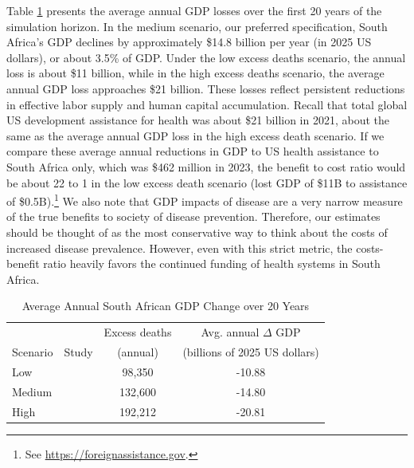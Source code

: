 \documentclass[letterpaper,12pt]{article}
\theoremstyle{definition}
\begin{document}
\begin{spacing}{1.5}
Table \ref{tab:avgGDPChange} presents the average annual GDP losses over the first 20 years of the simulation horizon. In the medium scenario, our preferred specification, South Africa's GDP declines by approximately \$14.8 billion per year (in 2025 US dollars), or about 3.5\% of GDP. Under the low excess deaths scenario, the annual loss is about \$11 billion, while in the high excess deaths scenario, the average annual GDP loss approaches \$21 billion. These losses reflect persistent reductions in effective labor supply and human capital accumulation. Recall that total global US development assistance for health was about \$21 billion in 2021, about the same as the average annual GDP loss in the high excess death scenario. If we compare these average annual reductions in GDP to US health assistance to South Africa only, which was \$462 million in 2023, the benefit to cost ratio would be about 22 to 1 in the low excess death scenario (lost GDP of \$11B to assistance of \$0.5B).\footnote{See \href{https://foreignassistance.gov}{https://foreignassistance.gov}.} We also note that GDP impacts of disease are a very narrow measure of the true benefits to society of disease prevention.  Therefore, our estimates should be thought of as the most conservative way to think about the costs of increased disease prevalence. However, even with this strict metric, the costs-benefit ratio heavily favors the continued funding of health systems in South Africa.

\begin{table}[H] \centering \captionsetup{width=6.0in}
  \caption{\label{tab:avgGDPChange}Average Annual South African GDP Change over 20 Years}
  \begin{tabular}{llcc}
    \hline\hline
             &       & Excess deaths & Avg. annual $\Delta$ GDP \\[-1.5mm]
    \multicolumn{1}{c}{Scenario} & \multicolumn{1}{c}{Study} & (annual) & (billions of 2025 US dollars) \\
    \hline\hline
    Low    & \citet{Brink2025}  &  98,350 & -10.88 \\
    Medium & \citet{Gandhi2025} & 132,600 & -14.80 \\
    High   & \citet{KS2025}     & 192,212 & -20.81 \\
    \hline\hline
  \end{tabular}
\end{table}


\end{spacing}
\end{document}
